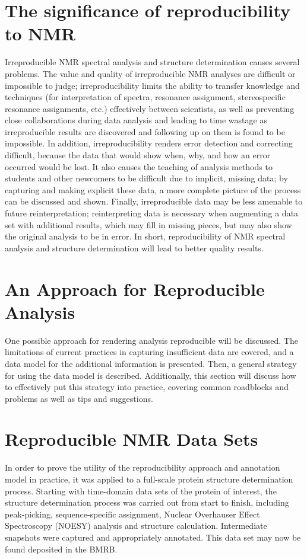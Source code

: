 \section{The significance of reproducibility to NMR}
Irreproducible NMR spectral analysis and structure determination causes 
several problems.  The value and 
quality of irreproducible NMR analyses are difficult or impossible to judge; 
irreproducibility limits the ability to transfer knowledge and techniques 
(for interpretation of spectra, resonance assignment, stereospecific resonance 
assignments, etc.) effectively between scientists, as well as preventing close 
collaborations during data analysis and leading to time wastage as 
irreproducible results are discovered and following up on them is found to be 
impossible.  In addition, irreproducibility renders error detection and 
correcting difficult, because the data that would show when, why, and how an 
error occurred would be lost.  It also causes the teaching of analysis methods 
to students and other newcomers to be difficult due to implicit, missing data; 
by capturing and making explicit these data, a more complete picture of the 
process can be discussed and shown.  Finally, irreproducible data may be less 
amenable to future reinterpretation; reinterpreting data is necessary when 
augmenting a data set with additional results, which may fill in missing 
pieces, but may also show the original analysis to be in error.  In short, 
reproducibility of NMR spectral analysis and structure determination will lead 
to better quality results.


\section{An Approach for Reproducible Analysis}
One possible approach for rendering analysis reproducible will be discussed.
The limitations of current practices in capturing insufficient data are 
covered, and a data model for the additional information is presented.
Then, a general strategy for using the data model is described.
Additionally, this section will discuss how to effectively put this strategy 
into practice, covering common roadblocks and problems as well as tips and 
suggestions.


\section{Reproducible NMR Data Sets}
In order to prove the utility of the reproducibility approach and annotation 
model in practice, it was applied to a full-scale protein structure 
determination process.  Starting with time-domain data sets of the protein of 
interest, the structure determination process was carried out from start to 
finish, including peak-picking, sequence-specific assignment, 
Nuclear Overhauser Effect Spectroscopy (NOESY) analysis 
and structure calculation.  Intermediate snapshots were captured and 
appropriately annotated.  This data set may now be found deposited in the BMRB.


